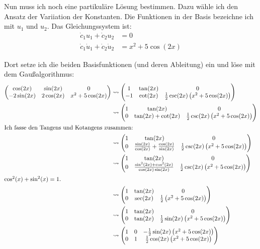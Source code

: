 \documentclass[11pt, ngerman]{article}
\begin{document}
Nun muss ich noch eine partikuläre Lösung bestimmen. Dazu wähle ich den Ansatz
der Variiation der Konstanten. Die Funktionen in der Basis bezeichne ich mit
$u_1$ und $u_2$. Das Gleichungssystem ist:
\begin{align*}
	\dot c_1 u_1 + \dot c_2 u_2 &= 0 \\
	\dot c_1 \dot u_1 + \dot c_2 \dot u_2 &= x^2 + 5 \cos(2x)
\end{align*}

Dort setze ich die beiden Basisfunktionen (und deren Ableitung) ein und löse
mit dem Gaußalgorithmus:
\begin{align*}
	\begin{pmatrix}
		\cos(2x) & \sin(2x) & 0 \\
		- 2 \sin(2x) & 2 \cos(2x) & x^2 + 5 \cos(2x)
	\end{pmatrix}
	&\leadsto
	\begin{pmatrix}
		1 & \tan(2x) & 0 \\
		-1 & \cot(2x) & \frac 12 \csc(2x) \del{x^2 + 5 \cos(2x)}
	\end{pmatrix} \\
	&\leadsto
	\begin{pmatrix}
		1 & \tan(2x) & 0 \\
		0 & \tan(2x) + \cot(2x) & \frac 12 \csc(2x) \del{x^2 + 5 \cos(2x)}
	\end{pmatrix} \\
	\intertext{Ich fasse den Tangens und Kotangens zusammen:}
	&\leadsto
	\begin{pmatrix}
		1 & \tan(2x) & 0 \\
		0 & \frac{\sin(2x)}{\cos(2x)} + \frac{\cos(2x)}{\sin(2x)} & \frac 12 \csc(2x) \del{x^2 + 5 \cos(2x)}
	\end{pmatrix} \\
	&\leadsto
	\begin{pmatrix}
		1 & \tan(2x) & 0 \\
		0 & \frac{\sin^2(2x) + \cos^2(2x)}{\cos(2x)\sin(2x)} & \frac 12 \csc(2x) \del{x^2 + 5 \cos(2x)}
	\end{pmatrix} \\
	\intertext{$\cos^2(x) + \sin^2(x) = 1$.}
	&\leadsto
	\begin{pmatrix}
		1 & \tan(2x) & 0 \\
		0 & \sec(2x) & \frac 12 \del{x^2 + 5 \cos(2x)}
	\end{pmatrix} \\
	&\leadsto
	\begin{pmatrix}
		1 & \tan(2x) & 0 \\
		0 & \tan(2x) & \frac 12 \sin(2x) \del{x^2 + 5 \cos(2x)}
	\end{pmatrix} \\
	&\leadsto
	\begin{pmatrix}
		1 & 0 & -\frac 12 \sin(2x) \del{x^2 + 5 \cos(2x)} \\
		0 & 1 & \frac 12 \cos(2x) \del{x^2 + 5 \cos(2x)}
	\end{pmatrix}
\end{align*}
\end{document}
